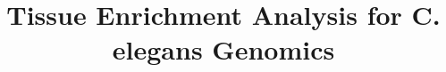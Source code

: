 \documentclass{bmcart}
\begin{document}
\begin{frontmatter}

\begin{fmbox}


\title{Tissue Enrichment Analysis for C. elegans Genomics}


\author[
   addressref={aff1},                   %
]{ }
\author[
   addressref={aff1},                   %
]{ }
\author[
   addressref={aff1},                   %
]{ }
\author[
   addressref={aff1},
   corref={aff1},
   email={pws@caltech.edu}
]{ }



\address[id=aff1]{%
  , %
  ,                     %
  ,                               %
  ,                              %
}




\end{fmbox}
\end{frontmatter}
\end{document}
